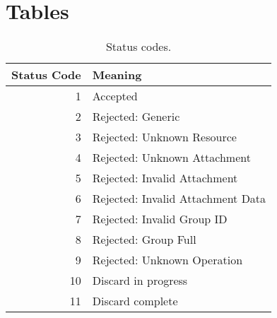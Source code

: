 \documentclass{article}
\begin{document}
\FloatBarrier
\clearpage

\appendix
\section{Tables}

\FloatBarrier

\begin{table}[h]
    \centering
    \begin{tabular}{r|l}
        Status Code & Meaning \\
        \hline
        1 & Accepted \\
        2 & Rejected: Generic \\
        3 & Rejected: Unknown Resource \\
        4 & Rejected: Unknown Attachment \\
        5 & Rejected: Invalid Attachment \\
        6 & Rejected: Invalid Attachment Data \\
        7 & Rejected: Invalid Group ID \\
        8 & Rejected: Group Full \\
        9 & Rejected: Unknown Operation \\
        10 & Discard in progress \\
        11 & Discard complete
    \end{tabular}
    \caption{Status codes.}
    \label{tab:status-codes}
\end{table}

\FloatBarrier
\clearpage

\printnoidxglossaries
\end{document}
